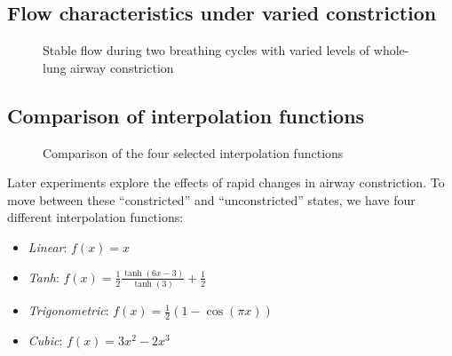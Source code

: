 \subsection{Flow characteristics under varied constriction} \label{sec:flow-characteristics}

\begin{figure}[ht!]
    \centering
    \begin{tikzpicture}
        
    \end{tikzpicture}
    \caption{
        Stable flow during two breathing cycles with varied levels of whole-lung airway constriction
    }
    \label{fig:constricted-flow-characteristics}
\end{figure}


\subsection{Comparison of interpolation functions}

\begin{figure}[ht!]
    \centering
    \begin{tikzpicture}
        
    \end{tikzpicture}
    \caption{Comparison of the four selected interpolation functions}
    \label{fig:interpolate-functions}
\end{figure}

Later experiments explore the effects of rapid changes in airway constriction. To move between these
``constricted'' and ``unconstricted'' states, we have four different interpolation functions:

\begin{itemize}
    \item \textit{Linear}: $f(x) = x$
    \item \textit{Tanh}: $f(x) = \frac{1}{2} \frac{\tanh(6x - 3)}{\tanh(3)} + \frac{1}{2}$
    \item \textit{Trigonometric}: $f(x) = \frac{1}{2} (1 - \cos(\pi x))$
    \item \textit{Cubic}: $f(x) = 3x^2 - 2x^3$
\end{itemize}


